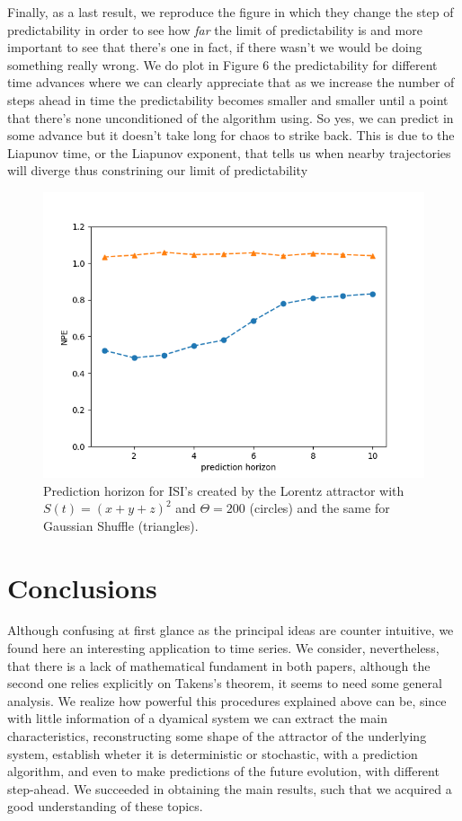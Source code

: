 \documentclass[10pt]{article}
\begin{document}
Finally, as a last result, we reproduce the figure in which they change the step of predictability in order to see how \textit{far} the limit of predictability is and more important to see that there's one in fact, if there wasn't we would be doing something really wrong. We do plot in Figure 6 the predictability for different time advances where we can clearly appreciate that as we increase the number of steps ahead in time the predictability becomes smaller and smaller until a point that there's none unconditioned of the algorithm using. So yes, we can predict in some advance but it doesn't take long for chaos to strike back. This is due to the Liapunov time, or the Liapunov exponent, that tells us when nearby trajectories will diverge thus constrining our limit of predictability

\begin{figure}[h!]
\centering
\includegraphics[scale=0.5]{prediction}
\caption{Prediction horizon for ISI's created by the Lorentz attractor with $S(t)=(x+y+z)^2$ and $\Theta = 200$ (circles) and the same for Gaussian Shuffle (triangles). }
\label{fig:distributions}
\end{figure}

\section{Conclusions}
Although confusing at first glance as the principal ideas are counter intuitive, we found here an interesting application to time series. We consider, nevertheless, that there is a lack of mathematical fundament in both papers, although the second one relies explicitly on Takens's theorem, it seems to need some general analysis. We realize how powerful this procedures explained above can be, since with little information of a dyamical system we can extract the main characteristics, reconstructing some shape of the attractor of the underlying system, establish wheter it is deterministic or stochastic, with a prediction algorithm, and even to make predictions of the future evolution, with different step-ahead. We succeeded in obtaining the main results, such that we acquired a good understanding of these topics.
\end{document}
